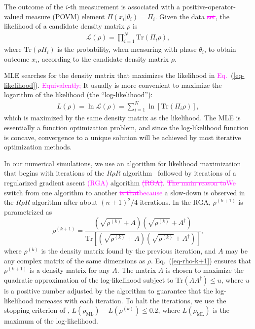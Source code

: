 \documentclass[
reprint,
superscriptaddress,
showpacs,
amsmath,
amssymb,
aps,
pra,
longbibliography
]{revtex4-1}
\providecommand{\aucmnt}[1]{#1}
\providecommand{\editcolor}[2]{\textcolor{#1}{#2}}
\providecommand{\aucmnt}[1]{}
\providecommand{\editcolor}[2]{#2}
\newcommand{\SG}[1]{\editcolor{magenta}{#1}}
\newcommand{\SGs}[1]{\aucmnt{\editcolor{magenta}{\sout{#1}}}}
\begin{document}
The outcome of the $i$-th measurement is associated with a
positive-operator-valued measure (POVM) element
$\Pi (x_i|\theta_i) = \Pi_i$. Given the data\SGs{ set}, the likelihood
of a candidate density matrix $\rho$ is
\begin{eqnarray}
  \mathcal{L} (\rho)= \prod_{i=1}^{N} \mathrm{Tr} (\Pi_i \rho),
  \label{eq-likelihood}
\end{eqnarray}
where $\mathrm{Tr}(\rho \Pi_i)$ is the probability, when measuring
with phase $\theta_i$, to obtain outcome $x_i$, according to the
candidate density matrix $\rho$.

MLE searches for the density matrix that maximizes the likelihood
in\SG{ Eq.}~(\ref{eq-likelihood}). \SGs{Equivalently, }It usually is
more convenient to maximize the logarithm of the likelihood (the
``log-likelihood''):
\begin{eqnarray}
  L (\rho) = \ln \mathcal{L} (\rho)= \sum_{i=1}^{N} \ln [\mathrm{Tr} (\Pi_i \rho)],
\end{eqnarray} 
which is maximized by the same density matrix as the likelihood. The
MLE is essentially a function optimization problem, and since the
log-likelihood function is concave, convergence to a unique solution
will be achieved by most iterative optimization methods.

In our numerical simulations, we use an algorithm for likelihood
maximization that begins with iterations of the $R\rho R$
algorithm~\cite{Rehacek2007} followed by iterations of a regularized
gradient ascent \SG{(RGA)} algorithm\SGs{ (RGA)}. \SGs{The main reason
  to}\SG{We } switch from one algorithm to another \SGs{is
  that}\SG{because} a slow-down is observed in the $R\rho R$ algorithm
after about $(n+1)^2/4$ iterations. In the RGA, $\rho^{(k+1)}$ is
parametrized as
\begin{equation}
  \rho^{(k+1)}=\frac{\left(\sqrt{\rho^{(k)}}+A\right)\left(\sqrt{\rho^{(k)}}+A^{\dagger}\right)}{\mathrm{Tr}\left[\left(\sqrt{\rho^{(k)}}+A\right)\left(\sqrt{\rho^{(k)}}+A^{\dagger}\right)\right]},
  \label{eq-rho-k+1}
\end{equation}
where $\rho^{(k)}$ is the density matrix found by the previous
iteration, and $A$ may be any complex matrix of the same dimensions as
$\rho$. Eq.~(\ref{eq-rho-k+1}) ensures that $\rho^{(k+1)}$ is a
density matrix for any $A$. The matrix $A$ is chosen to maximize the
quadratic approximation of the log-likelihood subject to
$\text{Tr}(AA^{\dagger})\leq u$, where $u$ is a positive number
adjusted by the algorithm to guarantee that the log-likelihood
increases with each iteration. To halt the iterations, we use the
stopping criterion of \cite{Glancy2012},
$L(\rho_{\text{ML}})-L(\rho^{(k)})\leq 0.2$, where
$L(\rho_{\text{ML}})$ is the maximum of the log-likelihood.
\end{document}
